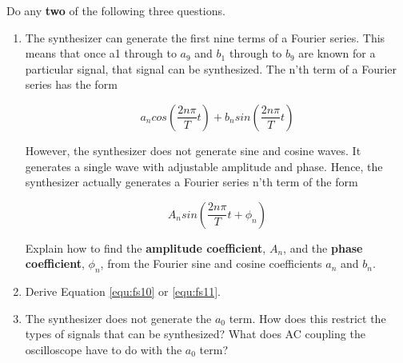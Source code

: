 Do any {\bf two} of the following three questions.
\begin{enumerate}

\item The synthesizer can generate the first nine terms of a Fourier series. This means that once a1 through to $a_9$ and $b_1$ through to $b_9$ are known for a particular signal, that signal can be synthesized. The n'th term of a Fourier series has the form

\begin{equation}
a_ncos\left(\dfrac{2n\pi}{T}t\right)+b_nsin\left(\dfrac{2n\pi}{T}t\right)
\label{equ:fs18}
\end{equation}

However, the synthesizer does not generate sine and cosine waves. It generates a single wave with adjustable amplitude and phase. Hence, the synthesizer actually generates a Fourier series n'th term of the form

\begin{equation}
A_nsin\left(\dfrac{2n\pi}{T}t+\phi_n\right)
\label{equ:fs19}
\end{equation}

Explain how to find the {\bf amplitude coefficient}, $A_n$, and the {\bf phase coefficient}, $\phi_n$, from the Fourier sine and cosine coefficients $a_n$ and $b_n$.
\item Derive Equation \ref{equ:fs10} or \ref{equ:fs11}.

\item The synthesizer does not generate the $a_0$ term. How does this restrict the types of signals that can be synthesized?  What does AC coupling the oscilloscope have to do with the $a_0$ term?

\end{enumerate}

